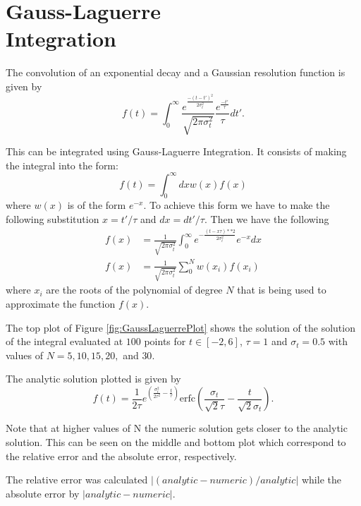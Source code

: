 \section{Gauss-Laguerre \\ Integration}

The convolution of an exponential decay and a Gaussian resolution function is given by
\begin{equation}
    f(t)=\int^\infty_0 \frac{e^{\frac{-(t-t')^2}{2\sigma^2_t}}}{\sqrt{2\pi\sigma^2_t}}\frac{e^{\frac{-t'}{\tau}}}{\tau}dt'.
    \label{eq:convolution}
\end{equation}

This can be integrated using Gauss-Laguerre Integration. It consists of making the integral into the form:
\begin{equation}
    f(t)=\int^\infty_0 dx w(x) f(x)
\end{equation}
where $w(x)$ is of the form $e^{-x}$. To achieve this form we have to make the following substitution $x=t'/\tau$ and $dx=dt'/\tau$. Then we have the following
\begin{align*}
    f(x)&=\frac{1}{\sqrt{2\pi\sigma_t^2}}\int^\infty_0 e^{-\frac{(t-x\tau)**2}{2\sigma_t^2}}e^{-x} dx\\
    f(x)&=\frac{1}{\sqrt{2\pi\sigma_t^2}}\sum_0^N w(x_i)f(x_i)
\end{align*}
where $x_i$ are the roots of the polynomial of degree $N$ that is being used to approximate the function $f(x)$.

The top plot of Figure \ref{fig:GaussLaguerrePlot} shows the solution of the solution of the integral evaluated at $100$ points for $t\in[-2,6]$, $\tau=1$ and $\sigma_t=0.5$ with values of $N=5,10,15,20,$ and $30$. 

The analytic solution plotted is given by
\begin{equation}
    f(t)=\frac{1}{2\tau}e^{\left(\frac{\sigma^2_t}{2\tau^2}-\frac{t}{\tau}\right)}\mathrm{erfc}\left(\frac{\sigma_t}{\sqrt{2}\tau}-\frac{t}{\sqrt{2}\sigma_t}\right).
    \label{eq:convAnalytic}
\end{equation}

Note that at higher values of N the numeric solution gets closer to the analytic solution. This can be seen on the middle and bottom plot which correspond to the relative error and the absolute error, respectively. 

The relative error was calculated $|(analytic-numeric)/analytic|$ while the absolute error by $|analytic-numeric|$.

